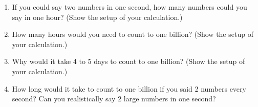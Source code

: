 \documentclass{article}
\begin{document}
\begin{enumerate}
\item If you could say two numbers in one second, how many numbers could you say in one hour? (Show the setup of your calculation.)

  \vfill

  \clearpage
\item How many hours would you need to count to one billion? (Show the setup of your calculation.)

  \vspace{1in}

\item Why would it take 4 to 5 days to count to one billion? (Show the setup of your calculation.)

  \vspace{1in}
  
\item How long would it take to count to one billion if you said 2 numbers every second? Can you realistically say 2 large numbers in one second?
\end{enumerate}

\renewcommand{\thefootnote}{\oldfn}
\end{document}
